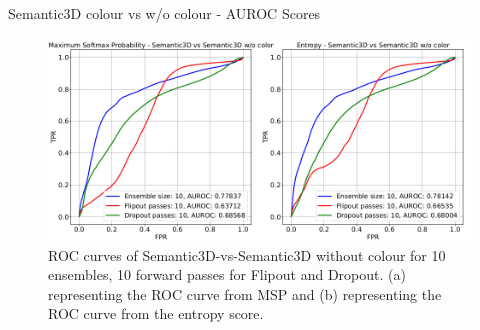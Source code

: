 \documentclass[aspectratio=169]{beamer}
\begin{document}
\begin{frame}{Semantic3D colour vs w/o colour - AUROC Scores}
    \begin{figure}
        \centering
        \includegraphics[scale=0.35]{images/ood2_roc_curves.jpg}
        \caption{ROC curves of Semantic3D-vs-Semantic3D without colour for 10 ensembles, 10 forward
        passes for Flipout and Dropout. (a) representing the ROC curve from MSP and (b) representing the ROC
        curve from the entropy score.}
    \end{figure}
\end{frame}

\end{document}
